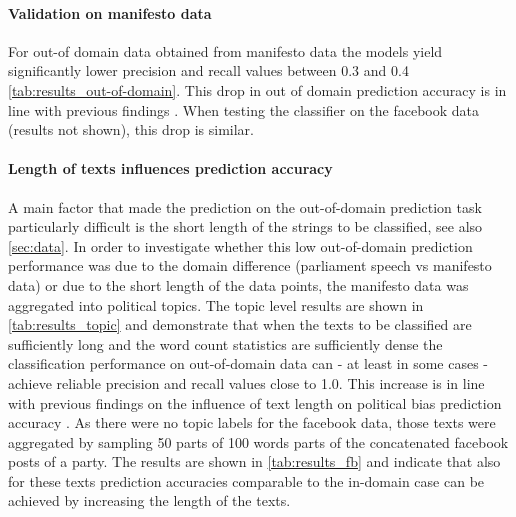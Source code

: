 \documentclass[11pt]{article}
\begin{document}
\paragraph{Validation on manifesto data}
For out-of domain data obtained from manifesto data the models yield significantly lower precision and recall values between 0.3 and 0.4 \autoref{tab:results_out-of-domain}. This drop in out of domain prediction accuracy is in line with previous findings \cite{Yu2008}. When testing the classifier on the facebook data (results not shown), this drop is similar.

\paragraph{Length of texts influences prediction accuracy}
A main factor that made the prediction on the out-of-domain prediction task particularly difficult is the short length of the strings to be classified, see also \autoref{sec:data}. In order to investigate whether this low out-of-domain prediction performance was due to the domain difference (parliament speech vs manifesto data) or due to the short length of the data points, the manifesto data was aggregated into political topics. The topic level results are shown in \autoref{tab:results_topic} and demonstrate that when the texts to be classified are sufficiently long and the word count statistics are sufficiently dense the classification performance on out-of-domain data can - at least in some cases - achieve reliable precision and recall values close to 1.0. This increase is in line with previous findings on the influence of text length on political bias prediction accuracy \cite{Hirst2014}. As there were no topic labels for the facebook data, those texts were aggregated by sampling 50 parts of 100 words parts of the concatenated facebook posts of a party. The results are shown in \autoref{tab:results_fb} and indicate that also for these texts prediction accuracies comparable to the in-domain case can be achieved by increasing the length of the texts. 
\end{document}
